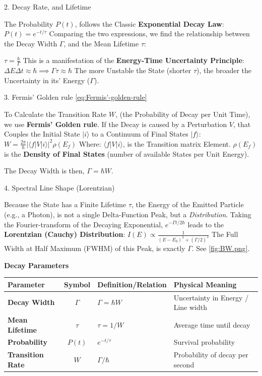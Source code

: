 \documentclass[a4paper, 10pt, onepage]{elegantbook}
\begin{document}
{    2. Decay Rate, and Lifetime  

The Probability $P(t)$, follows the Classic \textbf{Exponential Decay Law}:  
$ P(t) = e^{-t/\tau} $  
Comparing the two expressions, we find the relationship between the Decay Width $\Gamma$, and the Mean Lifetime $\tau$: 
 
$ \tau = \frac{\hbar}{\Gamma} $  
This is a manifestation of the \textbf{Energy-Time Uncertainty Principle}:  
$ \Delta E \Delta t \approx \hbar \implies \Gamma \tau \approx \hbar $  
The more Unstable the State (shorter $\tau$), the broader the Uncertainty in its' Energy ($\Gamma$).  

    3. Fermis' Golden rule \eqref{eq:Fermis'-golden-rule} 

To Calculate the Transition Rate $W$, (the Probability of Decay per Unit Time), we use \textbf{Fermis' Golden rule}. If 
the Decay is caused by a Perturbation $V$, that Couples the Initial State $|i\rangle$ to a Continuum of Final States 
$|f\rangle$:  
$ W = \frac{2\pi}{\hbar} |\langle f | V | i \rangle|^2 \rho(E_f) $  
Where:  
 $\langle f | V | i \rangle$, is the Transition matrix Element.  
 $\rho(E_f)$ is the \textbf{Density of Final States} (number of available States per Unit Energy).  

The Decay Width is then, $\Gamma = \hbar W$.  

    4. Spectral Line Shape (Lorentzian)  

Because the State has a Finite Lifetime $\tau$, the Energy of the Emitted Particle (e.g., a Photon), is not a single 
Delta-Function Peak, but a \emph{Distribution}. Taking the Fourier-transform of the Decaying 
Exponential, $e^{-\Gamma t / 2\hbar}$ leads to the \textbf{Lorentzian (Cauchy) Distribution}:  
$ I(E) \propto \frac{1}{(E - E_0)^2 + (\Gamma/2)^2} $  
The Full Width at Half Maximum (FWHM) of this Peak, is exactly $\Gamma$. See \ref{fig:BW.png}.  

    \textbf{Decay Parameters}  

\begin{table}[ht]
\centering
\begin{tabular}{|l|c|l|l|}
\hline
\textbf{Parameter} & \textbf{Symbol} & \textbf{Definition/Relation} & \textbf{Physical Meaning} \\
\hline
\textbf{Decay Width} & $\Gamma$ & $\Gamma = \hbar W$ & Uncertainty in Energy / Line width \\
\hline
\textbf{Mean Lifetime} & $\tau$ & $\tau = 1/W$ & Average time until decay \\
\hline
\textbf{Probability} & $P(t)$ & $e^{-t/\tau}$ & Survival probability \\
\hline
\textbf{Transition Rate} & $W$ & $\Gamma/\hbar$ & Probability of decay per second \\
\hline
\end{tabular}
\end{table}

}
\end{document}
